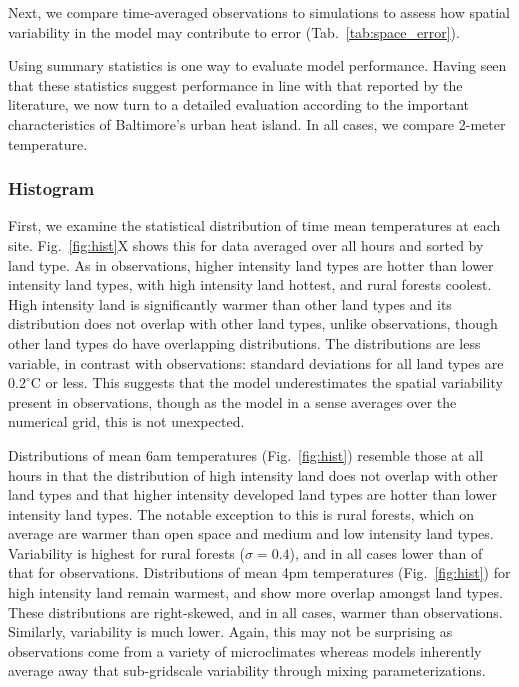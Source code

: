 \documentclass[draft,linenumbers]{agujournal}
\begin{document}
Next, we compare time-averaged observations to simulations to assess how spatial variability in the model may contribute to error (Tab.~\ref{tab:space_error}). 

Using summary statistics is one way to evaluate model performance. Having seen that these statistics suggest performance in line with that reported by the literature, we now turn to a detailed evaluation according to the important characteristics of Baltimore's urban heat island. In all cases, we compare 2-meter temperature.
\subsubsection{Histogram}
First, we examine the statistical distribution of time mean temperatures at each site. Fig.~\ref{fig:hist}X shows this for data averaged over all hours and sorted by land type. As in observations, higher intensity land types are hotter than lower intensity land types, with high intensity land hottest, and rural forests coolest. High intensity land is significantly warmer than other land types and its distribution does not overlap with other land types, unlike observations, though other land types do have overlapping distributions. The distributions are less variable, in contrast with observations: standard deviations for all land types are $0.2^\circ$C or less. This suggests that the model underestimates the spatial variability present in observations, though as the model in a sense averages over the numerical grid, this is not unexpected. 

Distributions of mean 6am temperatures (Fig.~\ref{fig:hist}) resemble those at all hours in that the distribution of high intensity land does not overlap with other land types and that higher intensity developed land types are hotter than lower intensity land types. The notable exception to this is rural forests, which on average are warmer than open space and medium and low intensity land types. Variability is highest for rural forests ($\sigma = 0.4$), and in all cases lower than of that for observations. Distributions of mean 4pm temperatures (Fig.~\ref{fig:hist}) for high intensity land remain warmest, and show more overlap amongst land types. These distributions are right-skewed, and in all cases, warmer than observations. Similarly, variability is much lower. Again, this may not be surprising as observations come from a variety of microclimates whereas models inherently average away that sub-gridscale variability through mixing parameterizations. 
\end{document}
